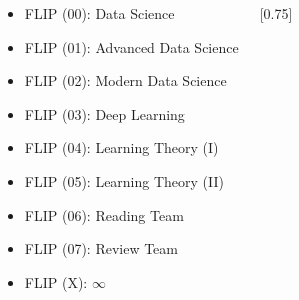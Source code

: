 \documentclass{tikzposter} %
\begin{document}
\begin{columns}
{\begin{minipage}[l]{0.6\linewidth}
{\begin{tikzpicture}[ every annotation/.style = {draw,
						fill = white}]
					\end{tikzpicture}
				}
			\end{minipage}
			\hfill
			\hspace{0.03\textwidth}
			\begin{minipage}[l]{0.4\linewidth}
				\vspace{-30pt}
				\begin{center}
					\begin{description}[font=\small]			
						\item[Flipper] \hfill
						\begin{itemize}
							\footnotesize
							\item FLIP (00): Data Science
							\item FLIP (01): Advanced Data Science
						\end{itemize}
						\item[Trainee] \hfill
						\begin{itemize}
							\footnotesize
							\item FLIP (02): Modern Data Science
							\item FLIP (03): Deep Learning
						\end{itemize}
						\item[$\infty$] \hfill
						\begin{itemize}
							\footnotesize
							\item FLIP (04): Learning Theory (I)
							\item FLIP (05): Learning Theory (II)
							\item FLIP (06): Reading Team
							\item FLIP (07): Review Team
							\item FLIP (X): $\infty$
						\end{itemize}
					\end{description}
				\end{center}				
			\end{minipage}
		}
		
		
		{
			\begin{minipage}[l]{0.55\linewidth}
				\scalebox{0.7}[0.75]{
					
}
\end{minipage}}
\end{columns}
\end{document}
